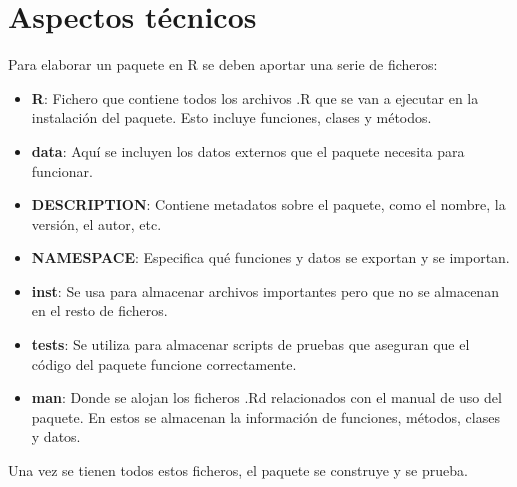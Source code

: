 \section{Aspectos técnicos}
\label{sec:org6e54692}
Para elaborar un paquete en R se deben aportar una serie de ficheros:
\begin{itemize}
\item \textbf{R}: Fichero que contiene todos los archivos .R que se van a ejecutar en la instalación del paquete. Esto incluye funciones, clases y métodos.
\item \textbf{data}: Aquí se incluyen los datos externos que el paquete necesita para funcionar.
\item \textbf{DESCRIPTION}: Contiene metadatos sobre el paquete, como el nombre, la versión, el autor, etc.
\item \textbf{NAMESPACE}: Especifica qué funciones y datos se exportan y se importan.
\item \textbf{inst}: Se usa para almacenar archivos importantes pero que no se almacenan en el resto de ficheros.
\item \textbf{tests}: Se utiliza para almacenar scripts de pruebas que aseguran que el código del paquete funcione correctamente.
\item \textbf{man}: Donde se alojan los ficheros .Rd relacionados con el manual de uso del paquete. En estos se almacenan la información de funciones, métodos, clases y datos.
\end{itemize}

Una vez se tienen todos estos ficheros, el paquete se construye y se prueba.
